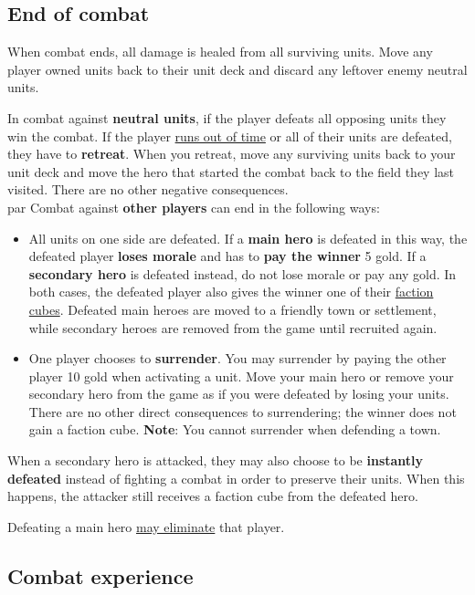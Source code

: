 \documentclass[12pt]{article}
\begin{document}
\subsection*{\hypertarget{Endcombat}{End of combat}}
When combat ends, all damage is healed from all surviving units. Move any player owned units back to their unit deck and discard any leftover enemy neutral units.\par
In combat against \textbf{neutral units}, if the player defeats all opposing units they win the combat. If the player \hyperlink{Timelimit}{runs out of time} or all of their units are defeated, they have to \textbf{retreat}. When you retreat, move any surviving units back to your unit deck and move the hero that started the combat back to the field they last visited. There are no other negative consequences.\\par
Combat against \textbf{other players} can end in the following ways:
\begin{itemize}
    \item All units on one side are defeated. If a \textbf{main hero} is defeated in this way, the defeated player \textbf{loses morale} and has to \textbf{pay the winner} 5 gold. If a \textbf{secondary hero} is defeated instead, do not lose morale or pay any gold. In both cases, the defeated player also gives the winner one of their \hyperlink{End}{faction cubes}. Defeated main heroes are moved to a friendly town or settlement, while secondary heroes are removed from the game until recruited again.
    \item One player chooses to \textbf{surrender}. You may surrender by paying the other player 10 gold when activating a unit. Move your main hero or remove your secondary hero from the game as if you were defeated by losing your units. There are no other direct consequences to surrendering; the winner does not gain a faction cube. \textbf{Note}: You cannot surrender when defending a town.
\end{itemize}
 When a secondary hero is attacked, they may also choose to be \textbf{instantly defeated} instead of fighting a combat in order to preserve their units. When this happens, the attacker still receives a faction cube from the defeated hero.\par Defeating a main hero \hyperlink{End}{may eliminate} that player.

\subsection*{\hypertarget{Combatexperience}{Combat experience}}
\end{document}
